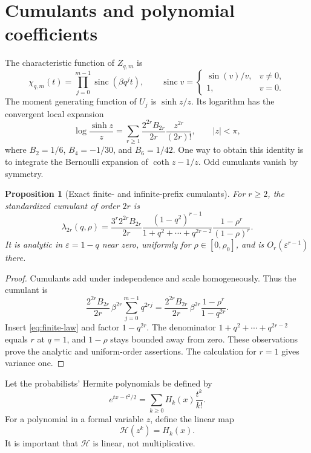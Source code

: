 \documentclass[11pt,a4paper]{article}
\numberwithin{equation}{section}
\newtheorem{proposition}[theorem]{Proposition}
\theoremstyle{definition}
\theoremstyle{remark}
\newcommand{\eps}{\varepsilon}
\newcommand{\sinc}{\operatorname{sinc}}
\begin{document}
\section{Cumulants and polynomial coefficients}
\label{sec:coeff-setup}

The characteristic function of $Z_{q,m}$ is
\begin{equation}
 \chi_{q,m}(t)=\prod_{j=0}^{m-1}\sinc(\beta q^jt),
 \qquad \sinc v=\begin{cases}\sin(v)/v,&v\ne0,\\1,&v=0.\end{cases}
 \label{eq:characteristic}
\end{equation}
The moment generating function of $U_j$ is $\sinh z/z$. Its logarithm has the
convergent local expansion
\begin{equation}
 \log\frac{\sinh z}{z}
 =\sum_{r\ge1}\frac{2^{2r}B_{2r}}{2r}\frac{z^{2r}}{(2r)!},
 \qquad |z|<\pi,
 \label{eq:uniform-logmgf}
\end{equation}
where $B_2=1/6$, $B_4=-1/30$, and $B_6=1/42$. One way to obtain this
identity is to integrate the Bernoulli expansion of
$\coth z-1/z$. Odd cumulants vanish by symmetry.

\begin{proposition}[Exact finite- and infinite-prefix cumulants]
\label{prop:cumulants}
For $r\ge2$, the standardized cumulant of order $2r$ is
\begin{equation}
 \lambda_{2r}(q,\rho)
 =\frac{3^r2^{2r}B_{2r}}{2r}
 \frac{(1-q^2)^{r-1}}{1+q^2+\cdots+q^{2r-2}}
 \frac{1-\rho^r}{(1-\rho)^r}.
 \label{eq:cumulants}
\end{equation}
It is analytic in $\eps=1-q$ near zero, uniformly for
$\rho\in[0,\rho_0]$, and is $O_r(\eps^{r-1})$ there.
\end{proposition}
\begin{proof}
Cumulants add under independence and scale homogeneously. Thus the cumulant is
\[
 \frac{2^{2r}B_{2r}}{2r}\,
 \beta^{2r}\sum_{j=0}^{m-1}q^{2rj}
 =\frac{2^{2r}B_{2r}}{2r}\,
 \beta^{2r}\frac{1-\rho^r}{1-q^{2r}}.
\]
Insert \eqref{eq:finite-law} and factor $1-q^{2r}$.
The denominator $1+q^2+\cdots+q^{2r-2}$ equals $r$ at $q=1$, and
$1-\rho$ stays bounded away from zero. These observations prove the analytic
and uniform-order assertions. The calculation for $r=1$ gives variance one.
\end{proof}

Let the probabilists' Hermite polynomials be defined by
\begin{equation}
 e^{tx-t^2/2}=\sum_{k\ge0}H_k(x)\frac{t^k}{k!}.
 \label{eq:hermite}
\end{equation}
For a polynomial in a formal variable $z$, define the linear map
\begin{equation}
 \mathcal H(z^k)=H_k(x).
 \label{eq:hermite-map}
\end{equation}
It is important that $\mathcal H$ is linear, not multiplicative.
\end{document}
